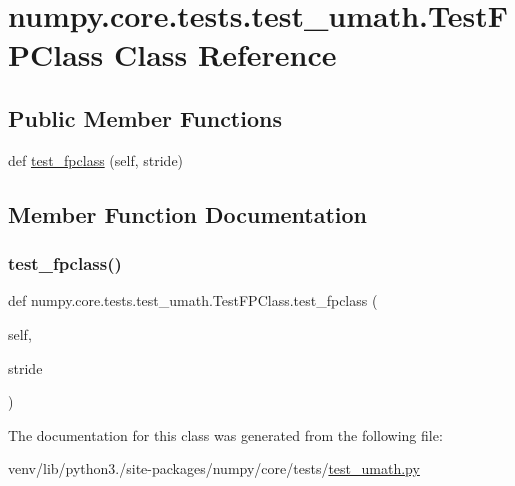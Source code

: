 \hypertarget{classnumpy_1_1core_1_1tests_1_1test__umath_1_1TestFPClass}{}\section{numpy.\+core.\+tests.\+test\+\_\+umath.\+Test\+F\+P\+Class Class Reference}
\label{classnumpy_1_1core_1_1tests_1_1test__umath_1_1TestFPClass}
\subsection*{Public Member Functions}
\begin{DoxyCompactItemize}
\item 
def \hyperlink{classnumpy_1_1core_1_1tests_1_1test__umath_1_1TestFPClass_ac62abe7def89110624bdc74a2392fab6}{test\+\_\+fpclass} (self, stride)
\end{DoxyCompactItemize}


\subsection{Member Function Documentation}
\mbox{\label{classnumpy_1_1core_1_1tests_1_1test__umath_1_1TestFPClass_ac62abe7def89110624bdc74a2392fab6}} 
\subsubsection{\texorpdfstring{test\+\_\+fpclass()}{test\_fpclass()}}
{\footnotesize\ttfamily def numpy.\+core.\+tests.\+test\+\_\+umath.\+Test\+F\+P\+Class.\+test\+\_\+fpclass (\begin{DoxyParamCaption}\item[{}]{self,  }\item[{}]{stride }\end{DoxyParamCaption})}



The documentation for this class was generated from the following file\+:\begin{DoxyCompactItemize}
\item 
venv/lib/python3./site-\/packages/numpy/core/tests/\hyperlink{test__umath_8py}{test\+\_\+umath.\+py}\end{DoxyCompactItemize}
